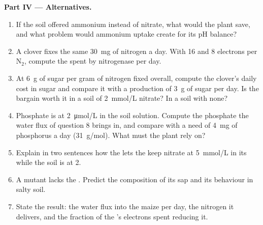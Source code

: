 \begin{problem}
\medskip
\noindent\textbf{Part IV --- Alternatives.}
\begin{enumerate}[resume]
  \item If the soil offered ammonium instead of nitrate, what would
        the plant save, and what problem would ammonium uptake create
        for its pH balance?
  \item A clover fixes the same \qty{30}{mg} of nitrogen a day. With
        \qty{16}{}  and \qty{8}{} electrons per $\mathrm{N_2}$,
        compute the  spent by nitrogenase per day.
  \item At \qty{6}{g} of sugar per gram of nitrogen fixed overall,
        compute the clover's daily cost in sugar and compare it with a
        production of \qty{3}{g} of sugar per day. Is the bargain
        worth it in a soil of \qty{2}{mmol/L} nitrate? In a soil with
        none?
  \item Phosphate is at \qty{2}{\micro mol/L} in the soil solution.
        Compute the phosphate the water flux of question 8 brings in,
        and compare with a need of \qty{4}{mg} of phosphorus a day
        (\qty{31}{g/mol}). What must the plant rely on?
  \item Explain in two sentences how the  lets the 
        keep nitrate at \qty{5}{mmol/L} in its  while the soil is
        at \qty{2}{}.
  \item A mutant lacks the . Predict the composition of
        its  sap and its behaviour in salty soil.
  \item State the result: the water flux into the maize  per day,
        the nitrogen it delivers, and the fraction of the 's
        electrons spent reducing it.
\end{enumerate}
\end{problem}
